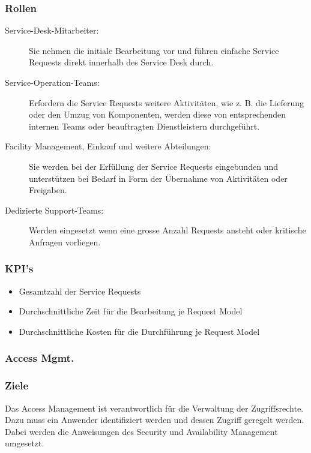 \subsubsection{Rollen}

\begin{description}
	\item[Service-Desk-Mitarbeiter:] Sie nehmen die initiale Bearbeitung vor und führen einfache Service Requests direkt innerhalb des Service Desk durch.
	\item[Service-Operation-Teams:] Erfordern die Service Requests weitere Aktivitäten, wie z. B. die Lieferung oder den Umzug von Komponenten, werden diese von entsprechenden internen Teams oder beauftragten Dienstleistern durchgeführt.
	\item[Facility Management, Einkauf und weitere Abteilungen:] Sie werden bei der Erfüllung der Service Requests eingebunden und unterstützen bei Bedarf in Form der Übernahme von Aktivitäten oder Freigaben.
	\item[Dedizierte Support-Teams:] Werden eingesetzt wenn eine grosse Anzahl Requests ansteht oder kritische Anfragen vorliegen.
\end{description}

\subsubsection{KPI's}

\begin{itemize}
	\item Gesamtzahl der Service Requests
	\item Durchschnittliche Zeit für die Bearbeitung je Request Model
	\item Durchschnittliche Kosten für die Durchführung je Request Model
\end{itemize}

\subsubsection{Access Mgmt.}

\subsubsection{Ziele}

Das Access Management ist verantwortlich für die Verwaltung der Zugriffsrechte. Dazu muss ein Anwender identifiziert werden und dessen Zugriff geregelt werden. Dabei werden die Anweisungen des Security und Availability Management umgesetzt.


